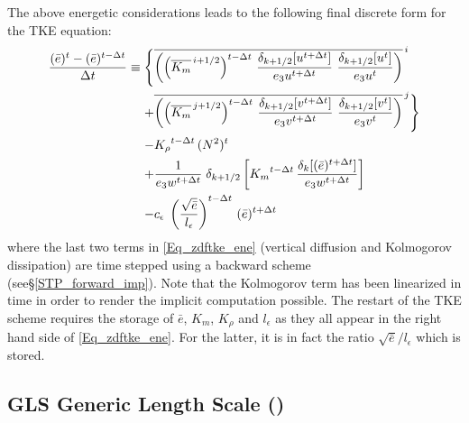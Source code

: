 The above energetic considerations leads to 
the following final discrete form for the TKE equation:
\begin{equation} \label{Eq_zdftke_ene}
\begin{split}
\frac { (\bar{e})^t - (\bar{e})^{t-\rdt} } {\rdt}  \equiv  
\Biggl\{ \Biggr.
  &\overline{ \left( \left(\overline{K_m}^{\,i+1/2}\right)^{t-\rdt} \,\frac{\delta_{k+1/2}[u^{t+\rdt}]}{{e_3u}^{t+\rdt} } 
                                                                              \ \frac{\delta_{k+1/2}[u^ t         ]}{{e_3u}^ t          }  \right) }^{\,i} \\
+&\overline{  \left( \left(\overline{K_m}^{\,j+1/2}\right)^{t-\rdt} \,\frac{\delta_{k+1/2}[v^{t+\rdt}]}{{e_3v}^{t+\rdt} } 
                                                                               \ \frac{\delta_{k+1/2}[v^ t         ]}{{e_3v}^ t          }  \right) }^{\,j} 
\Biggr. \Biggr\}   \\
%
- &{K_\rho}^{t-\rdt}\,{(N^2)^t}    \\
%
+&\frac{1}{{e_3w}^{t+\rdt}}  \;\delta_{k+1/2} \left[   {K_m}^{t-\rdt} \,\frac{\delta_{k}[(\bar{e})^{t+\rdt}]} {{e_3w}^{t+\rdt}}   \right]   \\
%
- &c_\epsilon \; \left( \frac{\sqrt{\bar {e}}}{l_\epsilon}\right)^{t-\rdt}\,(\bar {e})^{t+\rdt}
\end{split}
\end{equation}
where the last two terms in \eqref{Eq_zdftke_ene} (vertical diffusion and Kolmogorov dissipation) 
are time stepped using a backward scheme (see\S\ref{STP_forward_imp}). 
Note that the Kolmogorov term has been linearized in time in order to render 
the implicit computation possible. The restart of the TKE scheme 
requires the storage of $\bar {e}$, $K_m$, $K_\rho$ and $l_\epsilon$ as they all appear in 
the right hand side of \eqref{Eq_zdftke_ene}. For the latter, it is in fact 
the ratio $\sqrt{\bar{e}}/l_\epsilon$ which is stored. 

\subsection{GLS Generic Length Scale ()}
\label{ZDF_gls}


